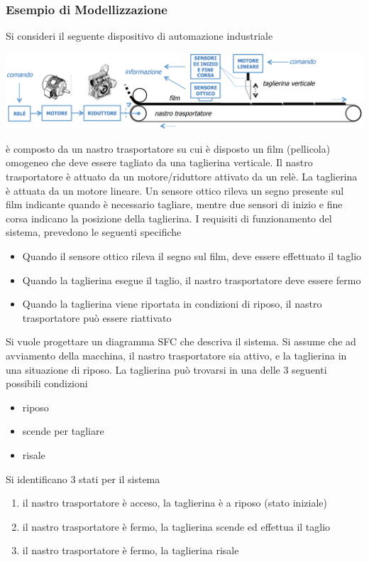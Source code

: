 \documentclass[10pt, letterpaper]{report}
\begin{document}
\subsubsection{Esempio di Modellizzazione}
Si consideri il seguente dispositivo di automazione industriale
\begin{center}
    \includegraphics[width=1\textwidth ]{images/nastroSFC.png}
\end{center}
è composto da un nastro trasportatore su
cui è disposto un film (pellicola) omogeneo che deve essere tagliato da una taglierina verticale.
Il nastro trasportatore è attuato da un motore/riduttore attivato da un relè. La
taglierina è attuata da un motore lineare. Un sensore ottico rileva un segno presente
sul film indicante quando è necessario tagliare, mentre due sensori di inizio e fine
corsa indicano la posizione della taglierina.
\acc 
I requisiti di funzionamento del sistema, prevedono le seguenti specifiche \begin{itemize}
    \item Quando il sensore ottico rileva il segno sul film, deve essere effettuato il taglio 
    \item Quando la taglierina esegue il taglio, il nastro trasportatore deve essere fermo 
    \item Quando la taglierina viene riportata in condizioni di riposo, il nastro trasportatore può
    essere riattivato
\end{itemize}
Si vuole progettare un diagramma SFC che descriva il sistema. Si assume che ad avviamento della macchina, il nastro trasportatore sia attivo, e la taglierina in una situazione di riposo. La taglierina può trovarsi in una delle 3 seguenti possibili condizioni\begin{itemize}
    \item riposo 
    \item scende per tagliare 
    \item risale
\end{itemize}
Si identificano 3 stati per il sistema\begin{enumerate}
    \item il nastro trasportatore è acceso, la taglierina è a riposo (stato iniziale)
    \item il nastro trasportatore è fermo, la taglierina scende ed effettua il taglio 
    \item il nastro trasportatore è fermo, la taglierina risale
\end{enumerate}
\end{document}
